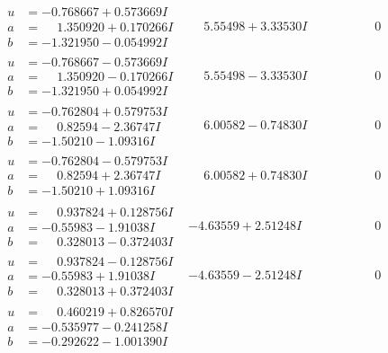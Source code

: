 \documentclass[1p]{elsarticle_modified}
\theoremstyle{definition}
\begin{document}
$$\begin{array}{c|c|c}
\begin{aligned}
u &= -0.768667 + 0.573669 I \\
a &= \phantom{-}1.350920 + 0.170266 I \\
b &= -1.321950 - 0.054992 I\end{aligned}
 & \phantom{-}5.55498 + 3.33530 I & \phantom{-0.000000 } 0 \\ \hline\begin{aligned}
u &= -0.768667 - 0.573669 I \\
a &= \phantom{-}1.350920 - 0.170266 I \\
b &= -1.321950 + 0.054992 I\end{aligned}
 & \phantom{-}5.55498 - 3.33530 I & \phantom{-0.000000 } 0 \\ \hline\begin{aligned}
u &= -0.762804 + 0.579753 I \\
a &= \phantom{-}0.82594 - 2.36747 I \\
b &= -1.50210 - 1.09316 I\end{aligned}
 & \phantom{-}6.00582 - 0.74830 I & \phantom{-0.000000 } 0 \\ \hline\begin{aligned}
u &= -0.762804 - 0.579753 I \\
a &= \phantom{-}0.82594 + 2.36747 I \\
b &= -1.50210 + 1.09316 I\end{aligned}
 & \phantom{-}6.00582 + 0.74830 I & \phantom{-0.000000 } 0 \\ \hline\begin{aligned}
u &= \phantom{-}0.937824 + 0.128756 I \\
a &= -0.55983 - 1.91038 I \\
b &= \phantom{-}0.328013 - 0.372403 I\end{aligned}
 & -4.63559 + 2.51248 I & \phantom{-0.000000 } 0 \\ \hline\begin{aligned}
u &= \phantom{-}0.937824 - 0.128756 I \\
a &= -0.55983 + 1.91038 I \\
b &= \phantom{-}0.328013 + 0.372403 I\end{aligned}
 & -4.63559 - 2.51248 I & \phantom{-0.000000 } 0 \\ \hline\begin{aligned}
u &= \phantom{-}0.460219 + 0.826570 I \\
a &= -0.535977 - 0.241258 I \\
b &= -0.292622 - 1.001390 I\end{aligned}

\end{array}$$
\end{document}
